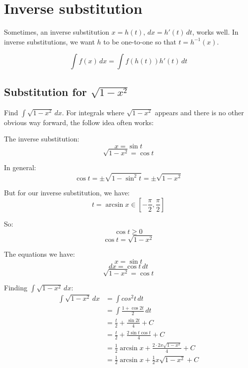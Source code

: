 \documentclass[11pt]{article}
\begin{document}
\section{Inverse substitution}
\label{sec:orgad23416}
Sometimes, an inverse substitution \(x = h(t), \, dx = h'(t) \, dt\), works well. In inverse substitutions, we want \(h\) to be one-to-one so that \(t = h^{-1} (x)\).

\[\int f(x) \, dx = \int f(h(t)) h'(t) \, dt\]

\subsection{Substitution for \(\sqrt{1 - x^2}\)}
\label{sec:org5a119a8}
Find \(\int \sqrt{1 - x^2} \, dx\). For integrals where \(\sqrt{1 - x^2}\) appears and there is no other obvious way forward, the follow idea often works:

\begin{center}
\end{center}

The inverse substitution:
\[x = \sin t\]
\[\sqrt{1 - x^2} = \cos t\]

In general:
\[\cos t = \pm \sqrt{1 - \sin^2 t} = \pm \sqrt{1 - x^2}\]

But for our inverse substitution, we have:
\[t = \arcsin x \in \left[- \frac{\pi}{2}, \frac{\pi}{2} \right]\]

So:
\[\cos t \ge 0\]
\[\cos t = \sqrt{1 - x^2}\]

The equations we have:
\[x = \sin t\]
\[dx = \cos t \, dt\]
\[\sqrt{1 - x^2} = \cos t\]

Finding \(\int \sqrt{1 - x^2} \, dx\):
\begin{align*}
\int \sqrt{1 - x^2} \, dx &= \int cos^2 t \, dt \\
&= \int \frac{1 + \cos 2t}{2} \, dt \\
&= \frac{t}{2} + \frac{\sin 2t}{4} + C \\
&= \frac{t}{2} + \frac{2 \sin t \cos t}{4} + C \\
&= \frac{1}{2} \arcsin x + \frac{2 \cdot 2x \sqrt{1 - x^2}}{4} + C \\
&= \frac{1}{2} \arcsin x + \frac{1}{2}x \sqrt{1 - x^2} + C \\
\end{align*}
\end{document}
